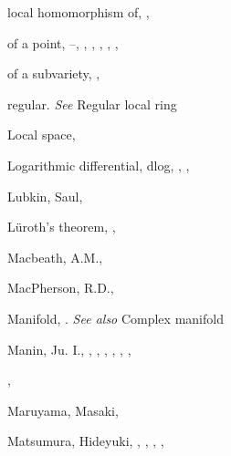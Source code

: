 {{\noindent\hspace*{7.5bp}local homomorphism of, , \par
\noindent\hspace*{7.5bp}of a point, --, , , , , , \par
\noindent\hspace*{7.5bp}of a subvariety, , \par
\noindent\hspace*{7.5bp}regular. \emph{See} Regular local ring\par
\noindent\hspace*{0.0bp}Local space, \par
\noindent\hspace*{0.0bp}Logarithmic differential, dlog, , , \par
\noindent\hspace*{0.0bp}Lubkin, Saul, \par
\noindent\hspace*{0.0bp}L\"uroth's theorem, , \par
\vspace{8.55bp}
\noindent\hspace*{0.0bp}Macbeath, A.M., \par
\noindent\hspace*{0.0bp}MacPherson, R.D., \par
\noindent\hspace*{0.0bp}Manifold, . \emph{See also} Complex manifold\par
\noindent\hspace*{0.0bp}Manin, Ju. I., , , , , , ,\par
\noindent\hspace*{15.0bp}, \par
\noindent\hspace*{0.0bp}Maruyama, Masaki, \par
\noindent\hspace*{0.0bp}Matsumura, Hideyuki, , , , ,\par
}}
